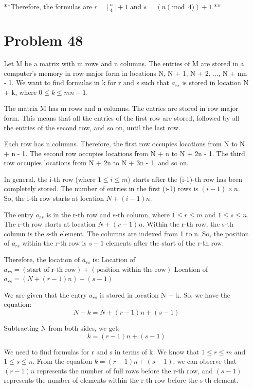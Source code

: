 \documentclass{article}
\begin{document}
**Therefore, the formulas are $r = \lfloor \frac{n}{4} \rfloor + 1$ and $s = (n \pmod 4) + 1$.**

\newpage

\section*{Problem 48}
Let M be a matrix with m rows and n columns. The entries of M are stored in a computer's memory in row major form in locations N, N + 1, N + 2, ..., N + mn - 1. We want to find formulas in k for r and s such that $a_{rs}$ is stored in location N + k, where $0 \le k \le mn - 1$.

The matrix M has m rows and n columns. The entries are stored in row major form. This means that all the entries of the first row are stored, followed by all the entries of the second row, and so on, until the last row.

Each row has n columns. Therefore, the first row occupies locations from N to N + n - 1. The second row occupies locations from N + n to N + 2n - 1. The third row occupies locations from N + 2n to N + 3n - 1, and so on.

In general, the i-th row (where $1 \le i \le m$) starts after the (i-1)-th row has been completely stored. The number of entries in the first (i-1) rows is $(i-1) \times n$.
So, the i-th row starts at location $N + (i-1)n$.

The entry $a_{rs}$ is in the r-th row and s-th column, where $1 \le r \le m$ and $1 \le s \le n$.
The r-th row starts at location $N + (r-1)n$.
Within the r-th row, the s-th column is the s-th element. The columns are indexed from 1 to n.
So, the position of $a_{rs}$ within the r-th row is $s-1$ elements after the start of the r-th row.

Therefore, the location of $a_{rs}$ is:
Location of $a_{rs} = (\text{start of r-th row}) + (\text{position within the row})$
Location of $a_{rs} = (N + (r-1)n) + (s-1)$

We are given that the entry $a_{rs}$ is stored in location N + k.
So, we have the equation:
$$N + k = N + (r-1)n + (s-1)$$

Subtracting N from both sides, we get:
$$k = (r-1)n + (s-1)$$

We need to find formulas for r and s in terms of k. We know that $1 \le r \le m$ and $1 \le s \le n$.
From the equation $k = (r-1)n + (s-1)$, we can observe that $(r-1)n$ represents the number of full rows before the r-th row, and $(s-1)$ represents the number of elements within the r-th row before the s-th element.
\end{document}
